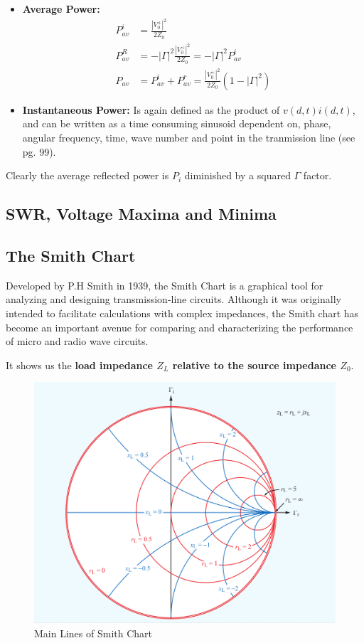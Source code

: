 \documentclass{book}
\begin{document}
\begin{itemize}
	\item \textbf{Average Power:}
	\begin{align*}
		P_{av}^i &= \frac{|V_0^+|^2}{2Z_0} \\
		P_{av}^R &= - |\Gamma|^2 \frac{|V_0^+|^2}{2Z_0} = -|\Gamma|^2 P_{av}^i \\
		P_{av} &= P_{av}^i + P_{av}^r =   \frac{|V_0^+|^2}{2Z_0} (1 - |\Gamma|^2)
	\end{align*}
	\item \textbf{Instantaneous Power:} Is again defined as the product of $v(d,t) i(d,t)$, and can be written as a time consuming sinusoid dependent on, phase, angular frequency, time, wave number and point in the tranmission line (see pg. 99).
\end{itemize}

Clearly the average reflected power is $P_i$ diminished by a squared $\Gamma$ factor.
\subsection{SWR, Voltage Maxima and Minima}


\subsection{The Smith Chart}

Developed by P.H Smith in 1939, the Smith Chart is a graphical tool for analyzing and designing transmission-line circuits. Although it was originally intended to facilitate calculations with complex impedances, the Smith chart has become an important avenue for comparing and characterizing the performance of micro and radio wave circuits.

It shows us the \textbf{load impedance $Z_L$ relative to the source impedance $Z_0$}. 

\begin{figure}[h]
	\centering
	\includegraphics[width=0.4\linewidth]{Screenshots/smith_chart}
	\caption{Main Lines of Smith Chart}
	\label{fig:smithchart}
\end{figure}
\end{document}
